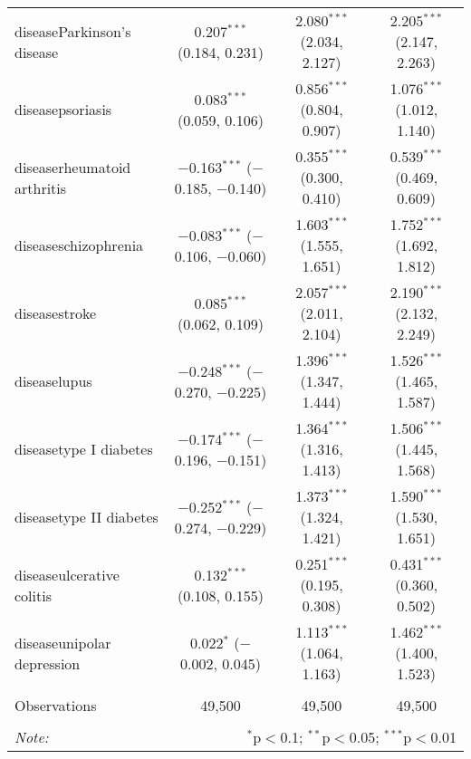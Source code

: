 \begin{table}[!htbp]
\begin{tabular}{@{\extracolsep{5pt}}lccc}
  diseaseParkinson's disease & 0.207$^{***}$ (0.184, 0.231) & 2.080$^{***}$ (2.034, 2.127) & 2.205$^{***}$ (2.147, 2.263) \\ 
  diseasepsoriasis & 0.083$^{***}$ (0.059, 0.106) & 0.856$^{***}$ (0.804, 0.907) & 1.076$^{***}$ (1.012, 1.140) \\ 
  diseaserheumatoid arthritis & $-$0.163$^{***}$ ($-$0.185, $-$0.140) & 0.355$^{***}$ (0.300, 0.410) & 0.539$^{***}$ (0.469, 0.609) \\ 
  diseaseschizophrenia & $-$0.083$^{***}$ ($-$0.106, $-$0.060) & 1.603$^{***}$ (1.555, 1.651) & 1.752$^{***}$ (1.692, 1.812) \\ 
  diseasestroke & 0.085$^{***}$ (0.062, 0.109) & 2.057$^{***}$ (2.011, 2.104) & 2.190$^{***}$ (2.132, 2.249) \\ 
  diseaselupus & $-$0.248$^{***}$ ($-$0.270, $-$0.225) & 1.396$^{***}$ (1.347, 1.444) & 1.526$^{***}$ (1.465, 1.587) \\ 
  diseasetype I diabetes & $-$0.174$^{***}$ ($-$0.196, $-$0.151) & 1.364$^{***}$ (1.316, 1.413) & 1.506$^{***}$ (1.445, 1.568) \\ 
  diseasetype II diabetes & $-$0.252$^{***}$ ($-$0.274, $-$0.229) & 1.373$^{***}$ (1.324, 1.421) & 1.590$^{***}$ (1.530, 1.651) \\ 
  diseaseulcerative colitis & 0.132$^{***}$ (0.108, 0.155) & 0.251$^{***}$ (0.195, 0.308) & 0.431$^{***}$ (0.360, 0.502) \\ 
  diseaseunipolar depression & 0.022$^{*}$ ($-$0.002, 0.045) & 1.113$^{***}$ (1.064, 1.163) & 1.462$^{***}$ (1.400, 1.523) \\ 
 \hline \\[-1.8ex] 
Observations & 49,500 & 49,500 & 49,500 \\ 
\hline 
\hline \\[-1.8ex] 
\textit{Note:}  & \multicolumn{3}{r}{$^{*}$p$<$0.1; $^{**}$p$<$0.05; $^{***}$p$<$0.01} \\ 
\end{tabular} 
\end{table} 

